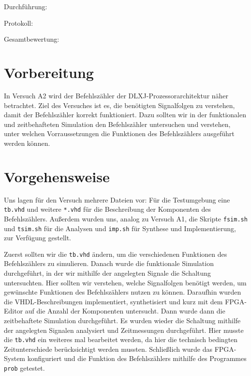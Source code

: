 \documentclass[12pt,a4paper]{scrartcl}
\begin{document}
Durchf\"uhrung:

Protokoll:

Gesamtbewertung:
\clearpage



\section{Vorbereitung}
In Versuch A2 wird der Befehlsz\"ahler der DLXJ-Prozessorarchitektur n\"aher betrachtet.
Ziel des Versuches ist es, die ben\"otigten Signalfolgen zu verstehen, damit der Befehlsz\"ahler korrekt funktioniert.
Dazu sollten wir in der funktionalen und zeitbehafteten Simulation den Befehlsz\"ahler untersuchen und verstehen, unter welchen Vorraussetzungen
die Funktionen des Befehlsz\"ahlers ausgef\"uhrt werden k\"onnen.

\section{Vorgehensweise}

Uns lagen f\"ur den Versuch mehrere Dateien vor: F\"ur die Testumgebung eine \texttt{tb.vhd} und weitere \texttt{*.vhd} f\"ur die Beschreibung der Komponenten des Befehlsz\"ahlers. Au\ss erdem wurden uns, analog zu Versuch A1, die Skripte \texttt{fsim.sh} und \texttt{tsim.sh} f\"ur die Analysen und \texttt{imp.sh} f\"ur Synthese und Implementierung, zur Verf\"ugung gestellt.

Zuerst sollten wir die \texttt{tb.vhd} \"andern, um die verschiedenen Funktionen des Befehlsz\"ahlers zu simulieren.
Danach wurde die funktionale Simulation durchgef\"uhrt, in der wir mithilfe der angelegten Signale die Schaltung untersuchten.
Hier sollten wir verstehen, welche Signalfolgen ben\"otigt werden, um gew\"unschte Funktionen des Befehlsz\"ahlers nutzen zu k\"onnen.
Daraufhin wurden die VHDL-Beschreibungen implementiert, synthetisiert und kurz mit dem FPGA-Editor auf die Anzahl der Komponenten untersucht.
Dann wurde dann die zeitbehaftete Simulation durchgef\"uhrt. Es wurden wieder die Schaltung mithilfe der angelegten Signalen analysiert und Zeitmessungen durchgef\"uhrt.
Hier musste die \texttt{tb.vhd} ein weiteres mal bearbeitet werden, da hier die technisch bedingten Zeitunterschiede ber\"ucksichtigt werden mussten.
Schlie\ss lich wurde das FPGA-System konfiguriert und die Funktion des Befehlsz\"ahlers mithilfe des Programmes \texttt{prob} getestet.


\newpage
\end{document}
